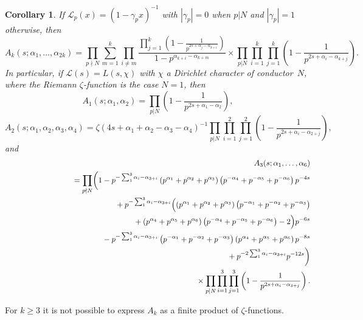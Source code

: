 \documentclass[12pt,letterpaper]{amsart}
\theoremstyle{plain}
\newtheorem{corollary}[theorem]{Corollary}
\theoremstyle{definition}
\theoremstyle{remark}
\numberwithin{equation}{subsection}
\numberwithin{theorem}{subsection}
\numberwithin{table}{subsection}
\def\({\left(}
\def\){\right)}
\begin{document}
\begin{corollary} \label{thm:zeta2kAk}
If $\mathcal{L}_p(x) = (1-\gamma_p x)^{-1}$ with
$|\gamma_p|=0$ when $p|N$ and $|\gamma_p|=1$ otherwise, then 
\begin{equation}
A_k(s;\alpha_1,\dots,\alpha_{2k})=  
 \prod_{p\nmid N} 
\sum_{m=1}^k
    \prod_{i\neq m}
       \frac{\displaystyle \prod_{j=1}^k \(1-\frac{1}{p^{2s+\alpha_j-\alpha_{k+i}}}\)}
                         {1-p^{\alpha_{k+i}-\alpha_{k+m}}}
\times
\prod_{p|N} \prod_{i=1}^k\prod_{j=1}^k
\left(1-\frac{1}{p^{2s +\alpha_i-\alpha_{k+j}}}\right).
\end{equation}
In particular, if $\mathcal{L}(s)=L(s,\chi)$ with $\chi$ a 
Dirichlet character of conductor~$N$, where the Riemann $\zeta$-function is the
case $N=1$, then
\begin{equation}
A_1(s;\alpha_1, \alpha_2)=\prod_{p|N} 
\left(1-\frac{1}{p^{2s +\alpha_1-\alpha_{2}}}\right),
\end{equation}
\begin{equation}
A_2(s;\alpha_1, \alpha_2,\alpha_3, \alpha_4)=
 \zeta(4s+\alpha_1+\alpha_2-\alpha_3-\alpha_4)^{-1} 
  \prod_{p|N} \prod_{i=1}^2\prod_{j=1}^2
   \left(1-\frac{1}{p^{2s +\alpha_i-\alpha_{2+j}}}\right),
\end{equation}
and
\begin{eqnarray} & &A_3(s;\alpha_1,\dots, \alpha_6)  \cr
& & \phantom{XXXX}=
  \prod_{p\nmid N}\biggl( 1 -  \mbox{}  p^{-\sum_1^3{\alpha_i-\alpha_{3+i}}}
    \left(
        p^{\alpha_1}+ p^{\alpha_2}+ p^{\alpha_3}
    \right)
    \left(
        p^{-\alpha_4}+ p^{-\alpha_5}+ p^{-\alpha_6}
    \right)
    p^{-4s} \nonumber \\
&&\phantom{XXXXxxxxxxx}\mbox{} + p^{-\sum_1^3{\alpha_i-\alpha_{3+i}}}
    \Bigl(
        \left(
            p^{\alpha_1}+ p^{\alpha_2}+ p^{\alpha_3}
        \right)
        \left(
            p^{-\alpha_1}+ p^{-\alpha_2}+ p^{-\alpha_3}
        \right)
         \nonumber \\
&&\phantom{XXXXxxxxxxx}\qquad\qquad\qquad\qquad+\left(
            p^{\alpha_4}+ p^{\alpha_5}+ p^{\alpha_6}
        \right)
        \left(
            p^{-\alpha_4}+ p^{-\alpha_5}+ p^{-\alpha_6}
        \right)
        -2
    \Bigr)
    p^{-6s} \nonumber \\
&&\phantom{XXXXxxxxxxx}\mbox{} - p^{-\sum_1^3{\alpha_i-\alpha_{3+i}}}
    \left(
        p^{-\alpha_1}+ p^{-\alpha_2}+ p^{-\alpha_3}
    \right)
    \left(
        p^{\alpha_4}+ p^{\alpha_5}+ p^{\alpha_6}
    \right)
    p^{-8s} \nonumber \\
&&\phantom{XXXXxxxxxxx}\mbox{} + p^{-2\sum_1^3{\alpha_i-\alpha_{3+i}}} p^{-12s}\biggr)\cr
& & \phantom{XXXX}
\times \prod_{p|N} \prod_{i=1}^3\prod_{j=1}^3
\left(1-\frac{1}{p^{2s +\alpha_i-\alpha_{3+j}}}\right).
\end{eqnarray}
\end{corollary}
For $k\ge 3$ it is not possible to express $A_k$ as a finite product of
$\zeta$-functions.
\end{document}

